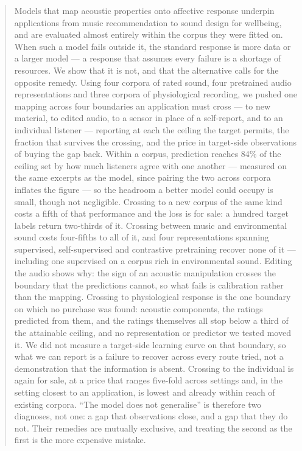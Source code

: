 


\maketitle
\iflinenums\linenumbers\fi

\begin{abstract}
\noindent
Models that map acoustic properties onto affective response underpin applications
from music recommendation to sound design for wellbeing, and are evaluated almost
entirely within the corpus they were fitted on. When such a model fails outside it,
the standard response is more data or a larger model --- a response that assumes
every failure is a shortage of resources. We show that it is not, and that the
alternative calls for the opposite remedy. Using four corpora of rated sound, four
pretrained audio representations and three corpora of physiological recording, we
pushed one mapping across four boundaries an application must cross --- to new
material, to edited audio, to a sensor in place of a self-report, and to an
individual listener --- reporting at each the ceiling the target permits, the
fraction that survives the crossing, and the price in target-side observations of
buying the gap back. Within a corpus, prediction reaches 84\% of the ceiling set by
how much listeners agree with one another --- measured on the same excerpts as the
model, since pairing the two across corpora inflates the figure --- so the headroom
a better model could occupy is small, though not negligible.
Crossing to a new corpus of the same kind costs a fifth of that performance and the
loss is for sale: a hundred target labels return two-thirds of it. Crossing between
music and environmental sound costs four-fifths to all of it, and four
representations spanning supervised, self-supervised and contrastive pretraining
recover none of it --- including one supervised on a corpus rich in environmental
sound. Editing the audio shows why: the sign of an acoustic manipulation crosses
the boundary that the predictions cannot, so what fails is calibration rather than
the mapping. Crossing to physiological response is the one boundary on which no
purchase was found: acoustic components, the ratings predicted from them, and the
ratings themselves all stop below a third of the attainable ceiling, and no
representation or predictor we tested moved it. We did not measure a target-side
learning curve on that boundary, so what we can report is a failure to recover
across every route tried, not a demonstration that the information is absent. Crossing to the individual is again for
sale, at a price that ranges five-fold across settings and, in the setting closest
to an application, is lowest and already within reach of existing corpora.
``The model does not generalise'' is
therefore two diagnoses, not one: a gap that observations close, and a gap that
they do not. Their remedies are mutually exclusive, and treating the second as the
first is the more expensive mistake.
\end{abstract}

